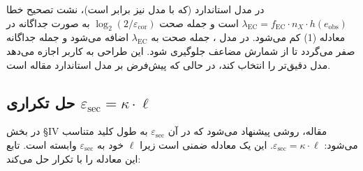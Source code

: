 در مدل استاندارد (که با مدل  نیز برابر است)، نشت تصحیح خطا $\lambda_{\text{EC}} = f_{\text{EC}} \cdot n_X \cdot h(e_{\text{obs}})$ است و جمله صحت $\log_2(2/\varepsilon_{\text{cor}})$ به صورت جداگانه در معادله (1) کم می‌شود. در مدل ، جمله صحت به $\lambda_{\text{EC}}$ اضافه می‌شود و جمله جداگانه صفر می‌گردد تا از شمارش مضاعف جلوگیری شود. این طراحی به کاربر اجازه می‌دهد مدل دقیق‌تر  را انتخاب کند، در حالی که پیش‌فرض بر مدل استاندارد مقاله است.

\subsection{حل تکراری \texorpdfstring{$\varepsilon_{\text{sec}} = \kappa \cdot \ell$}{epsilon = kappa * l}}

در بخش \S IV مقاله، روشی پیشنهاد می‌شود که در آن $\varepsilon_{\text{sec}}$ به طول کلید متناسب می‌شود: $\varepsilon_{\text{sec}} = \kappa \cdot \ell$. این یک معادله ضمنی است زیرا $\ell$ خود به $\varepsilon_{\text{sec}}$ وابسته است. تابع  این معادله را با تکرار حل می‌کند:

